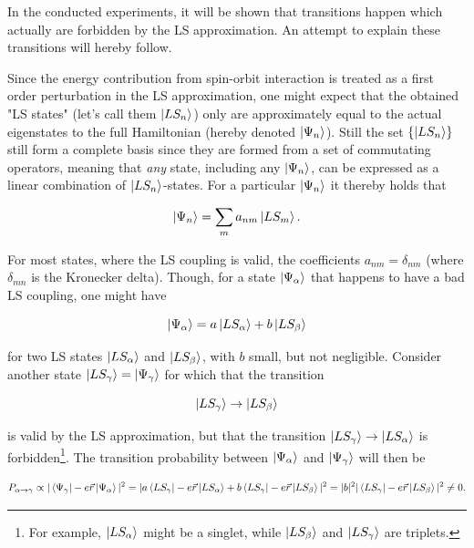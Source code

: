 \documentclass[a4paper]{article}
\begin{document}
In the conducted experiments, it will be shown that transitions happen which actually are forbidden by the LS approximation. An attempt to explain these transitions will hereby follow.

Since the energy contribution from spin-orbit interaction is treated as a first order perturbation in the LS approximation, one might expect that the obtained "LS states" (let's call them $\left| LS_n \right>$) only are approximately equal to the actual eigenstates to the full Hamiltonian (hereby denoted $\left| \Psi_n \right>$). Still the set $\{ \left| LS_n \right> \}$ still form a complete basis since they are formed from a set of commutating operators, meaning that \textit{any} state, including any $\left| \Psi_n \right>$, can be expressed as a linear combination of $\left| LS_n \right>$-states. For a particular $\left| \Psi_n \right>$ it thereby holds that

\begin{equation}

\ket{\Psi_n} = \sum_m a_{nm} \ket{LS_m}.

\end{equation}

For most states, where the LS coupling is valid, the coefficients $a_{nm} = \delta_{nm}$ (where $\delta_{mn}$ is the Kronecker delta). Though, for a state $\left| \Psi_\alpha \right>$ that happens to have a bad LS coupling, one might have

\begin{equation}

\ket{\Psi_\alpha} = a \ket{LS_\alpha} + b \ket{LS_\beta}

\end{equation}

for two LS states $\left| LS_\alpha \right>$ and $\left| LS_\beta \right>$, with $b$ small, but not negligible. Consider another state $\left| LS_\gamma \right> = \left| \Psi_\gamma \right>$ for which that the transition

\begin{equation}

\ket{LS_\gamma} \to \ket{LS_\beta}

\end{equation}

is valid by the LS approximation, but that the transition $\left| LS_\gamma \right> \to \left| LS_\alpha \right>$ is forbidden\footnote{For example, $\left| LS_\alpha \right>$ might be a singlet, while $\left| LS_\beta \right>$ and $\left| LS_\gamma \right>$ are triplets.}. The transition probability between $\left| \Psi_\alpha \right>$ and $\left| \Psi_\gamma \right>$ will then be

\begin{equation}

P_{\alpha \to \gamma} \propto |\bra{\Psi_\gamma}-e\vec{r}\ket{\Psi_\alpha}|^2 = |a\bra{LS_\gamma}-e\vec{r}\ket{LS_\alpha} + b\bra{LS_\gamma}-e\vec{r}\ket{LS_\beta}|^2 = |b|^2 |\bra{LS_\gamma}-e\vec{r}\ket{LS_\beta}|^2 \neq 0.

\end{equation}
\end{document}
